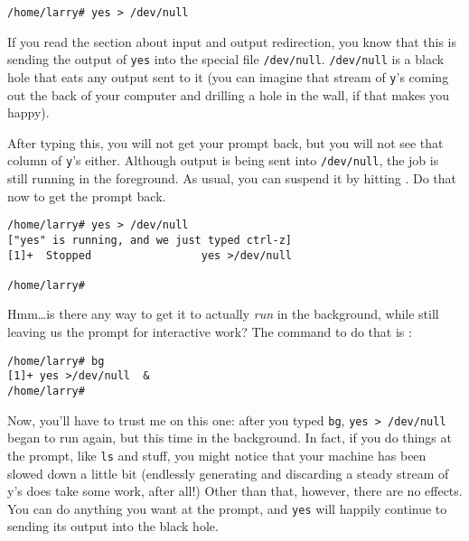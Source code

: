 \begin{screen}\begin{verbatim}
/home/larry# yes > /dev/null
\end{verbatim}\end{screen}

        If you read the section about input and output redirection,
you know that this is sending the output of {\tt yes} into the special
file {\tt /dev/null}.  {\tt /dev/null} is a black hole that eats any
output sent to it (you can imagine that stream of {\tt y}'s coming out
the back of your computer and drilling a hole in the wall, if that
makes you happy).
        
        After typing this, you will not get your prompt back, but you
will not see that column of {\tt y}'s either.  Although output is
being sent into {\tt /dev/null}, the job is still running in the
foreground.  As usual, you can suspend it by hitting .  Do that
now to get the prompt back.

\begin{screen}\begin{verbatim}
/home/larry# yes > /dev/null
["yes" is running, and we just typed ctrl-z]
[1]+  Stopped                 yes >/dev/null 

/home/larry# 
\end{verbatim}
\end{screen}

Hmm\ldots is there any way to get it to actually {\em run\/} in the
background, while still leaving us the prompt for interactive work?
The command to do that is :

\begin{screen}\begin{verbatim}
/home/larry# bg
[1]+ yes >/dev/null  &
/home/larry# 
\end{verbatim}
\end{screen}

Now, you'll have to trust me on this one: after you typed {\tt bg},
{\tt yes > /dev/null} began to run again, but this time in the
background.  In fact, if you do things at the prompt, like {\tt ls}
and stuff, you might notice that your machine has been slowed down a
little bit (endlessly generating and discarding a steady stream of y's
does take some work, after all!)  Other than that, however, there are
no effects.  You can do anything you want at the prompt, and {\tt yes}
will happily continue to sending its output into the black hole.

